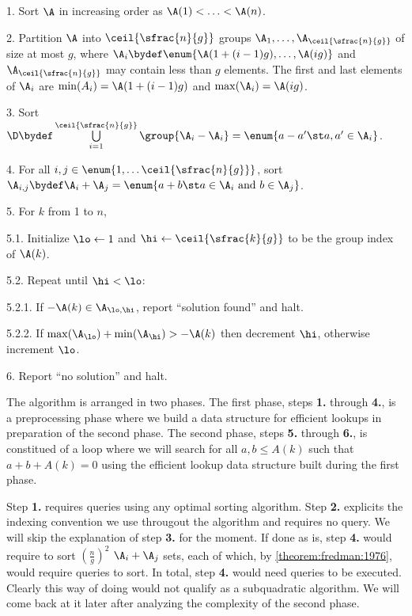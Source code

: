 \begin{algorithm}

\item[1.] Sort $\A$ in increasing order as $\A(1) < \ldots < \A(n)$.

\item[2.] Partition $\A$ into $\ceil{\sfrac{n}{g}}$ groups $\A_1, \ldots,
\A_{\ceil{\sfrac{n}{g}}}$ of size at most $g$, where $\A_i \bydef \enum{\A(1 + (i-1)g),
\ldots, \A(ig)}$ and $\A_{\ceil{\sfrac{n}{g}}}$ may contain less than $g$ elements.
The first and last elements of $\A_i$ are $\min(A_i) = \A(1 + (i-1)g)$ and
$\max(\A_i) = \A(ig)$.

\item[3.] Sort $\D \bydef \bigcup\limits_{i = 1}^{\ceil{\sfrac{n}{g}}}
\group{\A_i-\A_i} = \enum{a - a' \st a, a' \in \A_i}$.

\item[4.] For all $i,j \in \enum{1, \ldots \ceil{\sfrac{n}{g}}}$, sort $\A_{i,j}
\bydef \A_i + \A_j = \enum{a + b \st a \in \A_i \text{ and } b \in \A_j}$.

\item[5.] For $k$ from 1 to $n$,

\item[5.1.] Initialize $\lo \gets 1$ and $\hi \gets \ceil{\sfrac{k}{g}}$ to be
the group index of $\A(k)$.

\item[5.2.] Repeat until $\hi < \lo$:

\item[5.2.1.] If $-\A(k) \in \A_{\lo,\hi}$, report ``solution found'' and halt.

\item[5.2.2.] If $\max(\A_{\lo}) + \min(\A_{\hi}) > -\A(k)$ then decrement
$\hi$, otherwise increment $\lo$.

\item[6.] Report ``no solution'' and halt.

\end{algorithm}

The algorithm is arranged in two phases. The first phase, steps \textbf{1.}
through \textbf{4.}, is a preprocessing phase where we build a data structure
for efficient lookups in preparation of the second phase. The second phase, steps
\textbf{5.} through \textbf{6.}, is constitued of a loop where we will search
for all $a, b \le A(k)$ such that $a + b + A(k) = 0$ using the efficient lookup
data structure built during the first phase.

Step \textbf{1.} requires  queries using any optimal sorting
algorithm. Step \textbf{2.} explicits
the indexing convention we use througout the algorithm and requires no query.
We will skip the explanation of step \textbf{3.} for the moment. If done as is,
step \textbf{4.} would require to sort $(\frac{n}{g})^2$ $\A_i + \A_j$ sets,
each of which, by \ref{theorem:fredman:1976}, would require  queries
to sort. In total, step \textbf{4.} would need  queries to be
executed. Clearly this way of doing would not qualify as a subquadratic
algorithm. We will come back at it later after analyzing the complexity of the
second phase.

